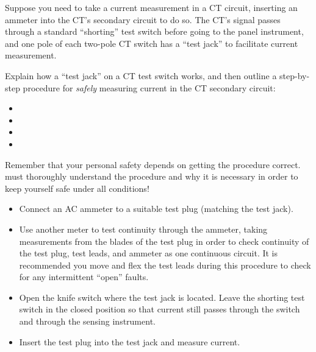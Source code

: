 

Suppose you need to take a current measurement in a CT circuit, inserting an ammeter into the CT's secondary circuit to do so.  The CT's signal passes through a standard ``shorting'' test switch before going to the panel instrument, and one pole of each two-pole CT switch has a ``test jack'' to facilitate current measurement.

\vskip 10pt

Explain how a ``test jack'' on a CT test switch works, and then outline a step-by-step procedure for {\it safely} measuring current in the CT secondary circuit:

\begin{itemize}
\item{} 
\vskip 10pt
\item{} 
\vskip 10pt
\item{} 
\vskip 10pt
\item{} 
\end{itemize}







Remember that your personal safety depends on getting the procedure correct.   must thoroughly understand the procedure and why it is necessary in order to keep yourself safe under all conditions!
 
\begin{itemize}
\item{} Connect an AC ammeter to a suitable test plug (matching the test jack).
\vskip 10pt
\item{} Use another meter to test continuity through the ammeter, taking measurements from the blades of the test plug in order to check continuity of the test plug, test leads, and ammeter as one continuous circuit.  It is recommended you move and flex the test leads during this procedure to check for any intermittent ``open'' faults.
\vskip 10pt 
\item{} Open the knife switch where the test jack is located.  Leave the shorting test switch in the closed position so that current still passes through the switch and through the sensing instrument.
\vskip 10pt
\item{} Insert the test plug into the test jack and measure current.
\end{itemize}











